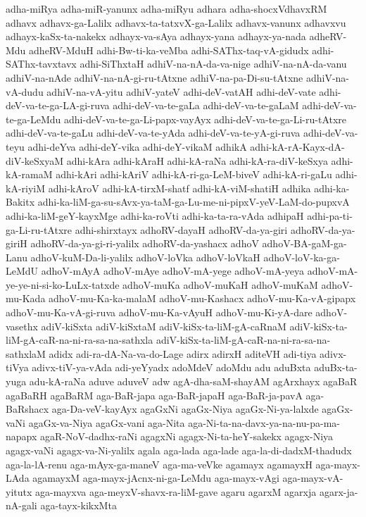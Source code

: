 {adha-miRya
adha-miR-yanunx
adha-miRyu
adhara
adha-shocxVdhavxRM
adhavx
adhavx-ga-Lalilx
adhavx-ta-tatxvX-ga-Lalilx
adhavx-vanunx
adhavxvu
adhayx-kaSx-ta-nakekx
adhayx-va-sAya
adhayx-yana
adhayx-ya-nada
adheRV-Mdu
adheRV-MduH
adhi-Bw-ti-ka-veMba
adhi-SAThx-taq-vA-gidudx
adhi-SAThx-tavxtavx
adhi-SiThxtaH
adhiV-na-nA-da-va-nige
adhiV-na-nA-da-vanu
adhiV-na-nAde
adhiV-na-nA-gi-ru-tAtxne
adhiV-na-pa-Di-su-tAtxne
adhiV-na-vA-dudu
adhiV-na-vA-yitu
adhiV-yateV
adhi-deV-vatAH
adhi-deV-vate
adhi-deV-va-te-ga-LA-gi-ruva
adhi-deV-va-te-gaLa
adhi-deV-va-te-gaLaM
adhi-deV-va-te-ga-LeMdu
adhi-deV-va-te-ga-Li-papx-vayAyx
adhi-deV-va-te-ga-Li-ru-tAtxre
adhi-deV-va-te-gaLu
adhi-deV-va-te-yAda
adhi-deV-va-te-yA-gi-ruva
adhi-deV-va-teyu
adhi-deYva
adhi-deY-vika
adhi-deY-vikaM
adhikA
adhi-kA-rA-Kayx-dA-diV-keSxyaM
adhi-kAra
adhi-kAraH
adhi-kA-raNa
adhi-kA-ra-diV-keSxya
adhi-kA-ramaM
adhi-kAri
adhi-kAriV
adhi-kA-ri-ga-LeM-biveV
adhi-kA-ri-gaLu
adhi-kA-riyiM
adhi-kAroV
adhi-kA-tirxM-shatf
adhi-kA-viM-shatiH
adhika
adhi-ka-Bakitx
adhi-ka-liM-ga-su-sAvx-ya-taM-ga-Lu-me-ni-pipxV-yeV-LaM-do-pupxvA
adhi-ka-liM-geY-kayxMge
adhi-ka-roVti
adhi-ka-ta-ra-vAda
adhipaH
adhi-pa-ti-ga-Li-ru-tAtxre
adhi-shirxtayx
adhoRV-dayaH
adhoRV-da-ya-giri
adhoRV-da-ya-giriH
adhoRV-da-ya-gi-ri-yalilx
adhoRV-da-yashacx
adhoV
adhoV-BA-gaM-ga-Lanu
adhoV-kuM-Da-li-yalilx
adhoV-loVka
adhoV-loVkaH
adhoV-loV-ka-ga-LeMdU
adhoV-mAyA
adhoV-mAye
adhoV-mA-yege
adhoV-mA-yeya
adhoV-mA-ye-ye-ni-si-ko-LuLx-tatxde
adhoV-muKa
adhoV-muKaH
adhoV-muKaM
adhoV-mu-Kada
adhoV-mu-Ka-ka-malaM
adhoV-mu-Kashacx
adhoV-mu-Ka-vA-gipapx
adhoV-mu-Ka-vA-gi-ruva
adhoV-mu-Ka-vAyuH
adhoV-mu-Ki-yA-dare
adhoV-vasethx
adiV-kiSxta
adiV-kiSxtaM
adiV-kiSx-ta-liM-gA-caRnaM
adiV-kiSx-ta-liM-gA-caR-na-ni-ra-sa-na-sathxla
adiV-kiSx-ta-liM-gA-caR-na-ni-ra-sa-na-sathxlaM
adidx
adi-ra-dA-Na-va-do-Lage
adirx
adirxH
aditeVH
adi-tiya
adivx-tiVya
adivx-tiV-ya-vAda
adi-yeYyadx
adoMdeV
adoMdu
adu
aduBxta
aduBx-ta-yuga
adu-kA-raNa
aduve
aduveV
adw
agA-dha-saM-shayAM
agArxhayx
agaBaR
agaBaRH
agaBaRM
aga-BaR-japa
aga-BaR-japaH
aga-BaR-ja-pavA
aga-BaRshacx
aga-Da-veV-kayAyx
agaGxNi
agaGx-Niya
agaGx-Ni-ya-lalxde
agaGx-vaNi
agaGx-va-Niya
agaGx-vani
aga-Nita
aga-Ni-ta-na-davx-ya-na-nu-pa-ma-napapx
agaR-NoV-dadhx-raNi
agagxNi
agagx-Ni-ta-heY-sakekx
agagx-Niya
agagx-vaNi
agagx-va-Ni-yalilx
agala
aga-lada
aga-lade
aga-la-di-dadxM-thadudx
aga-la-lA-renu
aga-mAyx-ga-maneV
aga-ma-veVke
agamayx
agamayxH
aga-mayx-LAda
agamayxM
aga-mayx-jAcnx-ni-ga-LeMdu
aga-mayx-vAgi
aga-mayx-vA-yitutx
aga-mayxva
aga-meyxV-shavx-ra-liM-gave
agaru
agarxM
agarxja
agarx-ja-nA-gali
aga-tayx-kikxMta
}
